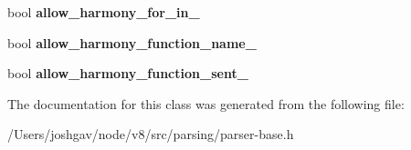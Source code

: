 \begin{DoxyCompactItemize}
\item 
bool {\bfseries allow\+\_\+harmony\+\_\+for\+\_\+in\+\_\+}\hypertarget{classv8_1_1internal_1_1_parser_base_a4bc926f056b204bae2f66b6135c8e67d}{}\label{classv8_1_1internal_1_1_parser_base_a4bc926f056b204bae2f66b6135c8e67d}

\item 
bool {\bfseries allow\+\_\+harmony\+\_\+function\+\_\+name\+\_\+}\hypertarget{classv8_1_1internal_1_1_parser_base_ad9137c1058e0a166d691e4847152a433}{}\label{classv8_1_1internal_1_1_parser_base_ad9137c1058e0a166d691e4847152a433}

\item 
bool {\bfseries allow\+\_\+harmony\+\_\+function\+\_\+sent\+\_\+}\hypertarget{classv8_1_1internal_1_1_parser_base_a5ea790214b4be3ee9d6e28d859d60a70}{}\label{classv8_1_1internal_1_1_parser_base_a5ea790214b4be3ee9d6e28d859d60a70}

\end{DoxyCompactItemize}


The documentation for this class was generated from the following file\+:\begin{DoxyCompactItemize}
\item 
/\+Users/joshgav/node/v8/src/parsing/parser-\/base.\+h\end{DoxyCompactItemize}
